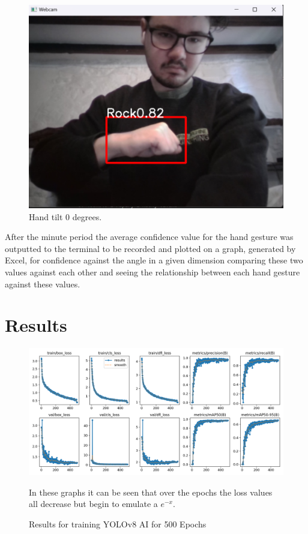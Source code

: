 \documentclass[conference]{IEEEtran}
\begin{document}
\begin{figure}
    \centering
    \includegraphics[width=1\linewidth]{method webcam.png}
    \caption{Hand tilt 0 degrees.}
    \label{fig:enter-label}
\end{figure}
\FloatBarrier

After the minute period the average confidence value for the hand gesture was outputted to the terminal to be recorded and plotted on a graph, generated by Excel, for confidence against the angle in a given dimension comparing these two values against each other and seeing the relationship between each hand gesture against these values.

\section{Results}


\begin{figure}[ht]
    \includegraphics[width=1\linewidth]{results.png}
    \caption{Results for training YOLOv8 AI for 500 Epochs}
    \label{training data}
    In these graphs it can be seen that over the epochs the loss values all decrease but begin to emulate a $e^{-x}.$
    
\end{figure}
\end{document}
